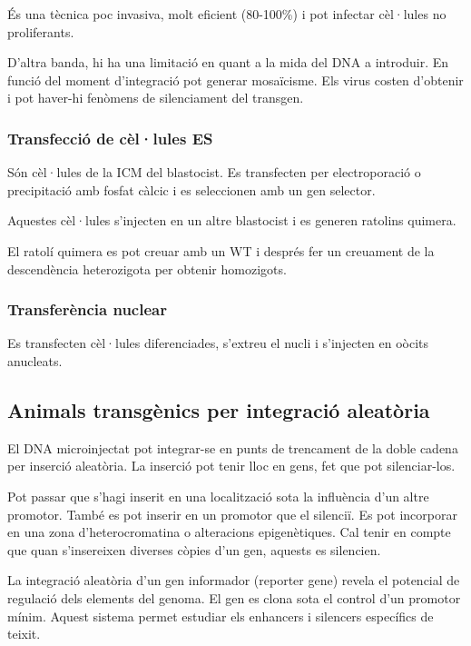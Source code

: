 És una tècnica poc invasiva, molt eficient (80-100\%) i pot infectar
cèl·lules no proliferants.

D'altra banda, hi ha una limitació en quant a la mida del DNA a
introduir. En funció del moment d'integració pot generar
mosaïcisme. Els virus costen d'obtenir i pot haver-hi fenòmens de
silenciament del transgen.

\subsubsection{Transfecció de cèl·lules ES }
\label{sec:transf-de-cel.l}

Són cèl·lules de la ICM del blastocist. Es transfecten per
electroporació o precipitació amb fosfat càlcic i es seleccionen amb
un gen selector.

Aquestes cèl·lules s'injecten en un altre blastocist i es generen
ratolins quimera.

El ratolí quimera es pot creuar amb un WT i després fer un creuament
de la descendència heterozigota per obtenir homozigots.

\subsubsection{Transferència nuclear}
\label{sec:transf-nucl}

Es transfecten cèl·lules diferenciades, s'extreu el nucli i s'injecten
en oòcits anucleats.

\subsection{Animals transgènics per integració aleatòria}
\label{sec:anim-transg-per}

El DNA microinjectat pot integrar-se en punts de trencament de la
doble cadena per inserció aleatòria. La inserció pot tenir lloc en
gens, fet que pot silenciar-los.

Pot passar que s'hagi inserit en una localització sota la influència
d'un altre promotor. També es pot inserir en un promotor que el
silenciï. Es pot incorporar en una zona d'heterocromatina o
alteracions epigenètiques. Cal tenir en compte que quan s'insereixen
diverses còpies d'un gen, aquests es silencien.

La integració aleatòria d'un gen informador (reporter gene) revela el
potencial de regulació dels elements del genoma. El gen es clona sota
el control d'un promotor mínim. Aquest sistema permet estudiar els
enhancers i silencers específics de teixit.

